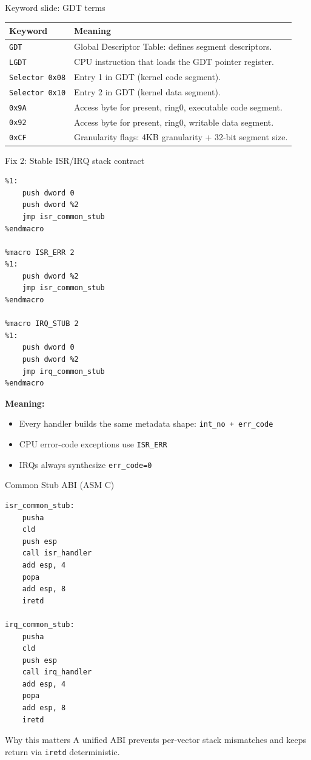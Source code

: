 \documentclass[aspectratio=169]{beamer}
\newcommand{\concept}[2]{%
  \begin{block}{#1}\smallskip #2\smallskip\end{block}\vspace{5pt}}
\begin{document}
\begin{frame}[fragile]{Keyword slide: GDT terms}
  \small
  \begin{tabular}{@{}p{2.5cm}p{9.5cm}@{}}
    \toprule
    \textbf{Keyword} & \textbf{Meaning} \\
    \midrule
    \texttt{GDT} & Global Descriptor Table: defines segment descriptors. \\
    \texttt{LGDT} & CPU instruction that loads the GDT pointer register. \\
    \texttt{Selector 0x08} & Entry 1 in GDT (kernel code segment). \\
    \texttt{Selector 0x10} & Entry 2 in GDT (kernel data segment). \\
    \texttt{0x9A} & Access byte for present, ring0, executable code segment. \\
    \texttt{0x92} & Access byte for present, ring0, writable data segment. \\
    \texttt{0xCF} & Granularity flags: 4KB granularity + 32-bit segment size. \\
    \bottomrule
  \end{tabular}
\end{frame}

\begin{frame}[fragile]{Fix 2: Stable ISR/IRQ stack contract}
  \begin{lstlisting}[style=asm]
%macro ISR_NOERR 2
%1:
    push dword 0
    push dword %2
    jmp isr_common_stub
%endmacro

%macro ISR_ERR 2
%1:
    push dword %2
    jmp isr_common_stub
%endmacro

%macro IRQ_STUB 2
%1:
    push dword 0
    push dword %2
    jmp irq_common_stub
%endmacro
  \end{lstlisting}
  \textbf{Meaning:}
  \begin{itemize}
    \item Every handler builds the same metadata shape: \texttt{int\_no + err\_code}
    \item CPU error-code exceptions use \texttt{ISR\_ERR}
    \item IRQs always synthesize \texttt{err\_code=0}
  \end{itemize}
\end{frame}

\begin{frame}[fragile]{Common Stub ABI (ASM \textrightarrow C)}
  \begin{lstlisting}[style=asm]
isr_common_stub:
    pusha
    cld
    push esp
    call isr_handler
    add esp, 4
    popa
    add esp, 8
    iretd

irq_common_stub:
    pusha
    cld
    push esp
    call irq_handler
    add esp, 4
    popa
    add esp, 8
    iretd
  \end{lstlisting}
  \concept{Why this matters}{
    A unified ABI prevents per-vector stack mismatches and keeps return via \texttt{iretd} deterministic.
  }
\end{frame}
\end{document}
